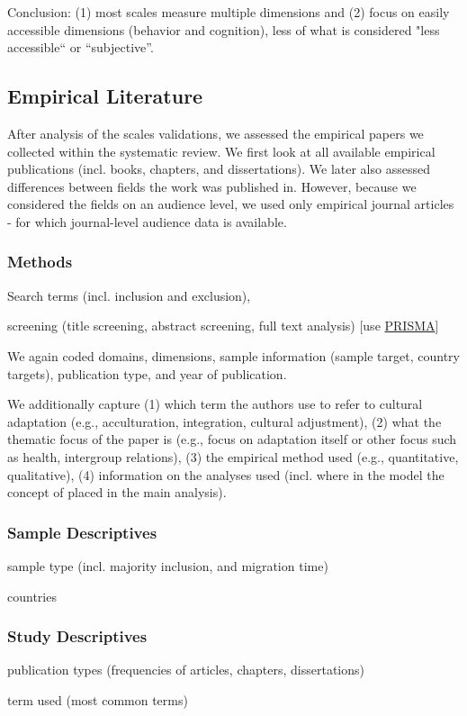\documentclass[man, 12pt, a4paper]{apa7}
\begin{document}
Conclusion: (1) most scales measure multiple dimensions and (2) focus on easily accessible dimensions (behavior and cognition), less of what is considered "less accessible“ or “subjective”.

\subsection{Empirical Literature}
After analysis of the scales validations, we assessed the empirical papers we collected within the systematic review. We first look at all available empirical publications (incl. books, chapters, and dissertations). We later also assessed differences between fields the work was published in. However, because we considered the fields on an audience level, we used only empirical journal articles - for which journal-level audience data is available.
\subsubsection{Methods}
Search terms (incl. inclusion and exclusion),

screening (title screening, abstract screening, full text analysis) [use \href{http://prisma-statement.org/PRISMAStatement/FlowDiagram}{PRISMA}]

We again coded domains, dimensions, sample information (sample target, country targets), publication type, and year of publication.

We additionally capture (1) which term the authors use to refer to cultural adaptation (e.g., acculturation, integration, cultural adjustment), (2) what the thematic focus of the paper is (e.g., focus on adaptation itself or other focus such as health, intergroup relations), (3) the empirical method used (e.g., quantitative, qualitative), (4) information on the analyses used (incl. where in the model the concept of placed in the main analysis).
\subsubsection{Sample Descriptives}
sample type (incl. majority inclusion, and migration time)

countries
\subsubsection{Study Descriptives}
publication types (frequencies of articles, chapters, dissertations)

term used (most common terms)
\end{document}
